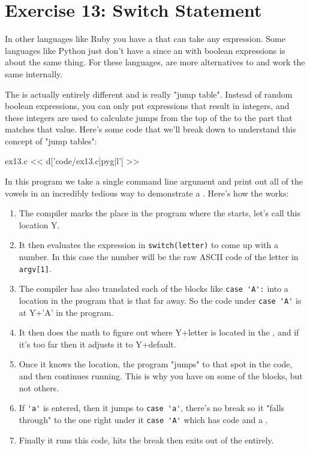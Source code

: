 \chapter{Exercise 13: Switch Statement}

In other languages like Ruby you have a  that can take
any expression.  Some languages like Python just don't have a
 since an  with boolean expressions
is about the same thing.  For these languages,  are
more alternatives to  and work the same internally.

The  is actually entirely different and is really "jump
table".  Instead of random boolean expressions, you can only put expressions
that result in integers, and these integers are used to calculate jumps from
the top of the  to the part that matches that value.  Here's some
code that we'll break down to understand this concept of "jump tables":

\begin{code}{ex13.c}
<< d['code/ex13.c|pyg|l'] >>
\end{code}

In this program we take a single command line argument and print out all
of the vowels in an incredibly tedious way to demonstrate
a .  Here's how the 
works:

\begin{enumerate}
\item The compiler marks the place in the program where the
     starts, let's call this location Y.
\item It then evaluates the expression in \verb|switch(letter)| to
    come up with a number.  In this case the number will be the
    raw ASCII code of the letter in \verb|argv[1]|.
\item The compiler has also translated each of the  
    blocks like \verb|case 'A':| into a location in the program
    that is that far away.  So the code under \verb|case 'A'| is
    at Y+'A' in the program.
\item It then does the math to figure out where Y+letter is
    located in the , and if it's too
    far then it adjusts it to Y+default.
\item Once it knows the location, the program "jumps" to that spot
    in the code, and then continues running.  This is why you have
     on some of the  blocks, but not others.
\item If \verb|'a'| is entered, then it jumps to \verb|case 'a'|, there's
    no break so it "falls through" to the one right under it \verb|case 'A'|
    which has code and a .
\item Finally it runs this code, hits the break then exits out of the
     entirely.
\end{enumerate}

